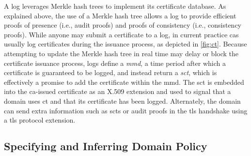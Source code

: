 A log leverages Merkle hash trees to implement its certificate database. As
explained above, the use of a Merkle hash tree allows a log to provide efficient
proofs of presence (i.e., audit proofs) and proofs of consistency (i.e.,
consistency proofs). While anyone may submit a certificate to a log, in current
practice \acp{ca} usually log certificates during the issuance process, as
depicted in \autoref{fig:ct}. Because attempting to update the Merkle hash tree
in real time may delay or block the certificate issuance process, logs define a
\emph{\ac{mmd}}, a time period after which a certificate is guaranteed to be
logged, and instead return a \emph{\ac{sct}}, which is effectively a promise to
add the certificate within the \ac{mmd}. The \ac{sct} is embedded into the
\ac{ca}-issued certificate as an X.509 extension and used to signal that a
domain uses \ac{ct} and that its certificate has been logged. Alternately, the
domain can send extra information such as \acp{sct} or audit proofs in the
\ac{tls} handshake using a \ac{tls} protocol extension.



\subsection{Specifying and Inferring Domain Policy}
\label{sec:background:policy}

